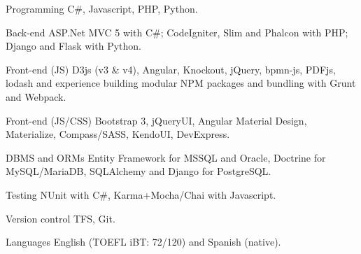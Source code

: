 


\begin{cvskills}


\cvskill
{Programming} %
{C\#, Javascript, PHP, Python.} %


\cvskill
{Back-end} %
{ASP.Net MVC 5 with C\#; CodeIgniter, Slim and Phalcon with PHP; Django and Flask with Python.} %


\cvskill
{Front-end (JS)} %
{D3js (v3 \& v4), Angular, Knockout, jQuery, bpmn-js, PDFjs, lodash and experience building
	 modular NPM packages and bundling with Grunt and Webpack.} %
	

\cvskill
{Front-end (JS/CSS)} %
{Bootstrap 3, jQueryUI, Angular Material Design, Materialize, Compass/SASS, KendoUI, DevExpress.} %


\cvskill
{DBMS and ORMs} %
{Entity Framework for MSSQL and Oracle, Doctrine for MySQL/MariaDB, SQLAlchemy and Django for PostgreSQL.} %



\cvskill
{Testing} %
{NUnit with C\#, Karma+Mocha/Chai with Javascript.} %



\cvskill
{Version control} %
{TFS, Git.} %



\cvskill
{Languages} %
{English (TOEFL iBT: 72/120) and Spanish (native).} %


\end{cvskills}